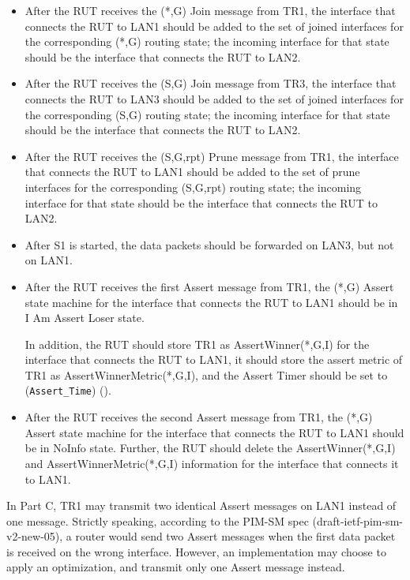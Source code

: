 \documentclass[11pt]{report}
\begin{document}

\begin{itemize}

  \item After the RUT receives the (*,G) Join message from TR1, the
  interface that connects the RUT to LAN1 should be
  added to the set of joined interfaces for the corresponding (*,G)
  routing state; the incoming interface for that state should be the
  interface that connects the RUT to LAN2.

  \item After the RUT receives the (S,G) Join message from TR3, the
  interface that connects the RUT to LAN3 should be
  added to the set of joined interfaces for the corresponding (S,G)
  routing state; the incoming interface for that state should be the
  interface that connects the RUT to LAN2.

  \item After the RUT receives the (S,G,rpt) Prune message from TR1, the
  interface that connects the RUT to LAN1 should be
  added to the set of prune interfaces for the corresponding (S,G,rpt)
  routing state; the incoming interface for that state should be the
  interface that connects the RUT to LAN2.

  \item After S1 is started, the data packets should be forwarded on LAN3, but
  not on LAN1.

  \item After the RUT receives the first Assert message from TR1, the (*,G)
  Assert state machine for the interface that connects the RUT to LAN1 should
  be in I Am Assert Loser state.

  In addition, the RUT should store TR1 as AssertWinner(*,G,I) for the
  interface that connects the RUT to LAN1, it should store the assert metric
  of TR1 as AssertWinnerMetric(*,G,I), and the Assert Timer should be set to
  (\verb=Assert_Time=) ({\PimsmAssertTime}).

  \item After the RUT receives the second Assert message from TR1, the (*,G)
  Assert state machine for the interface that connects the RUT to LAN1 should
  be in NoInfo state.
  Further, the RUT should delete the AssertWinner(*,G,I) and
  AssertWinnerMetric(*,G,I) information for the interface that connects it to
  LAN1.

\end{itemize}

In Part C, TR1 may transmit two identical Assert messages on LAN1 instead of
one message. Strictly speaking, according to the PIM-SM spec
(draft-ietf-pim-sm-v2-new-05), a router would send two Assert messages
when the first data packet is received on the wrong interface.
However, an implementation may choose to apply an optimization, and
transmit only one Assert message instead.
\end{document}

